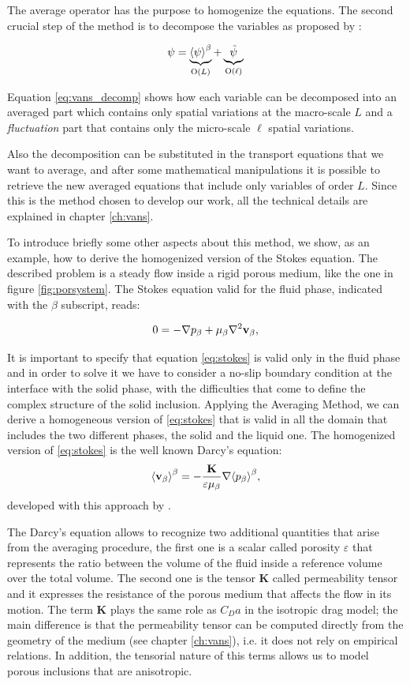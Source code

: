 The average operator has the purpose to homogenize the equations. The second crucial step of the method is to decompose the variables as proposed by \citet{gray1975derivation}:

\begin{equation}
\psi =   \underbrace{ {\left< \psi \right>}^{\beta} }_\text{O($L$)}  +  \underbrace{\tilde{\psi} }_\text{O($\ell$)}
\label{eq:vans_decomp}
\end{equation}

\noindent Equation \eqref{eq:vans_decomp} shows how each variable can be decomposed into an averaged part which contains only spatial variations at the macro-scale $L$ and a \textit{fluctuation} part that contains only the micro-scale $\ell$ spatial variations.

Also the decomposition can be substituted in the transport equations that we want to average, and after some mathematical manipulations it is possible to retrieve the new averaged equations that include only variables of order $L$.
Since this is the method chosen to develop our work, all the technical details are explained in chapter \ref{ch:vans}.

To introduce briefly some other aspects about this method, we show, as an example, how to derive the homogenized version of the Stokes equation. The described problem is a steady flow inside a rigid porous medium, like the one in figure \ref{fig:porsystem}.
The Stokes equation valid for the fluid phase, indicated with the $\beta$ subscript, reads:

\begin{equation}
0 = - \nabla p_{\beta} +\mu_{\beta} \nabla^2 \textbf{v}_{\beta},
\label{eq:stokes}
\end{equation} 

It is important to specify that equation \eqref{eq:stokes} is valid only in the fluid phase and in order to solve it we have to consider a no-slip boundary condition at the interface with the solid phase, with the difficulties that come to define the complex structure of the solid inclusion.
Applying the Averaging Method, we can derive a homogeneous version of \eqref{eq:stokes} that is valid in all the domain that includes the two different phases, the solid and the liquid one.
The homogenized version of \eqref{eq:stokes} is the well known Darcy's equation:
$${\left< \textbf{v}_{\beta} \right>}^{\beta} = -\dfrac{ \mathbf{K} }{\varepsilon \mu_{\beta}} \nabla {\left< p_{\beta} \right>}^{\beta},$$
developed with this approach by  \citet{whitaker1986flow}.

The Darcy's equation allows to recognize two additional quantities that arise from the averaging procedure, the first one is a scalar called porosity $\varepsilon$ that represents the ratio between the volume of the fluid inside a reference volume over the total volume.
The second one is the tensor $\mathbf{K}$ called permeability tensor and it expresses the resistance of the porous medium that affects the flow in its motion.
The term $\mathbf{K}$ plays the same role as $C_D a$ in the isotropic drag model; the main difference is that the permeability tensor can be computed directly from the geometry of the medium (see chapter \ref{ch:vans}), i.e. it does not rely on empirical relations.
In addition, the tensorial nature of this terms allows us to model porous inclusions that are anisotropic.

